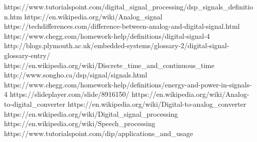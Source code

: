 \documentclass{article}
\begin{document}
    \begin{thebibliography}{9}
     https://www.tutorialspoint.com/digital\_signal\_processing/dsp\_signals\_definition.htm
     https://en.wikipedia.org/wiki/Analog\_signal
     https://techdifferences.com/difference-between-analog-and-digital-signal.html
     https://www.chegg.com/homework-help/definitions/digital-signal-4
     http://blogs.plymouth.ac.uk/embedded-systems/glossary-2/digital-signal-glossary-entry/
     https://en.wikipedia.org/wiki/Discrete\_time\_and\_continuous\_time
     http://www.songho.ca/dsp/signal/signals.html
     https://www.chegg.com/homework-help/definitions/energy-and-power-in-signals-4
     https://slideplayer.com/slide/8916150/
     https://en.wikipedia.org/wiki/Analog-to-digital\_converter
     https://en.wikipedia.org/wiki/Digital-to-analog\_converter
     https://en.wikipedia.org/wiki/Digital\_signal\_processing
     https://en.wikipedia.org/wiki/Speech\_processing
     https://www.tutorialspoint.com/dip/applications\_and\_usage
    \end{thebibliography}
\end{document}
